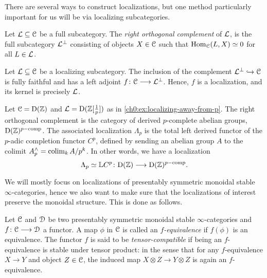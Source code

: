 There are several ways to construct localizations, but one method particularly important for us will be via localizing subcategories. 

\begin{definition}
    \label{ch0:def:right-orthogonal-complement}
    Let $\mathcal{L}\subseteq \EuScript{C}$ be a full subcategory. The \emph{right orthogonal complement} of $\mathcal{L}$, is the full subcategory $\mathcal{L}^\perp$ consisting of objects $X\in \EuScript{C}$ such that $\operatorname{Hom}_{\EuScript{C}}(L,X)\simeq 0$ for all $L\in \mathcal{L}$.  
\end{definition}

\begin{example}
    \label{ch0:ex:localization-from-localizing-subcategory}
    Let $\mathcal{L}\subseteq \EuScript{C}$ be a localizing subcategory. The inclusion of the complement $\mathcal{L}^\perp \hookrightarrow \EuScript{C}$ is fully faithful and has a left adjoint $f\colon \EuScript{C}\longrightarrow \mathcal{L}^\perp$. Hence, $f$ is a localization, and its kernel is precisely $\mathcal{L}$. 
\end{example}

\begin{example}
    \label{ch0:ex:derived-p-completion}
    Let $\EuScript{C}=\mathrm{D}(\mathbb{Z})$ and $\mathcal{L} = \mathrm{D}(\mathbb{Z}[\frac{1}{p}])$ as in \cref{ch0:ex:localizing-away-from-p}. The right orthogonal complement is the category of derived $p$-complete abelian groups, $\mathrm{D}(\mathbb{Z})^{p-\mathrm{comp}}$. The associated localization $\Lambda_p$ is the total left derived functor of the $p$-adic completion functor $C^p$, defined by sending an abelian group $A$ to the colimit $A^\wedge_p = \operatorname{colim}_k A/p^k$. In other words, we have a localization 
    \[\Lambda_p \simeq \mathbb{L} C^p \colon \mathrm{D}(\mathbb{Z})\longrightarrow \mathrm{D}(\mathbb{Z})^{p-\mathrm{comp}}.\]
\end{example}

We will mostly focus on localizations of presentably symmetric monoidal stable $\infty$-categories, hence we also want to make sure that the localizations of interest preserve the monoidal structure. This is done as follows. 

\begin{definition}
    \label{ch0:def:L-equivalence}
    Let $\EuScript{C}$ and $\EuScript{D}$ be two presentably symmetric monoidal stable $\infty$-categories and $f\colon \EuScript{C}\longrightarrow \EuScript{D}$ a functor. A map $\phi$ in $\EuScript{C}$ is called an \emph{$f$-equivalence} if $f(\phi)$ is an equivalence. The functor $f$ is said to be \emph{tensor-compatible} if being an $f$-equivalence is stable under tensor product: in the sense that for any $f$-equivalence $X\longrightarrow Y$ and object $Z\in \EuScript{C}$, the induced map $X\otimes Z\longrightarrow Y\otimes Z$ is again an $f$-equivalence. 
\end{definition}

